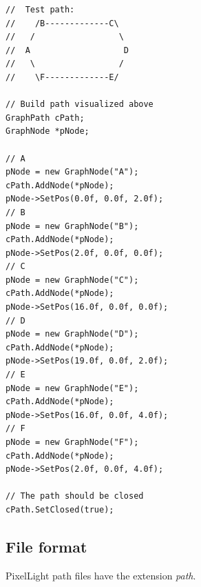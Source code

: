 \begin{lstlisting}[caption=Path creation example]
//	Test path:
//	  /B-------------C\
//	 /                 \
//	A                   D
//	 \                 /
//	  \F-------------E/

// Build path visualized above
GraphPath cPath;
GraphNode *pNode;

// A
pNode = new GraphNode("A");
cPath.AddNode(*pNode);
pNode->SetPos(0.0f, 0.0f, 2.0f);
// B
pNode = new GraphNode("B");
cPath.AddNode(*pNode);
pNode->SetPos(2.0f, 0.0f, 0.0f);
// C
pNode = new GraphNode("C");
cPath.AddNode(*pNode);
pNode->SetPos(16.0f, 0.0f, 0.0f);
// D
pNode = new GraphNode("D");
cPath.AddNode(*pNode);
pNode->SetPos(19.0f, 0.0f, 2.0f);
// E
pNode = new GraphNode("E");
cPath.AddNode(*pNode);
pNode->SetPos(16.0f, 0.0f, 4.0f);
// F
pNode = new GraphNode("F");
cPath.AddNode(*pNode);
pNode->SetPos(2.0f, 0.0f, 4.0f);

// The path should be closed
cPath.SetClosed(true);
\end{lstlisting}


\subsection{File format}
PixelLight path files have the extension \emph{path}.
